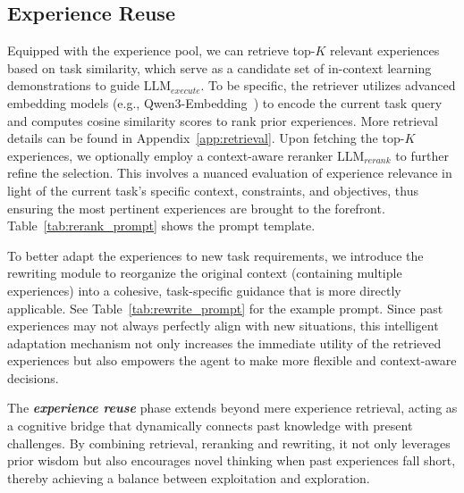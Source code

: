 \documentclass[11pt]{article}
\begin{document}
\subsection{Experience Reuse}\label{sec:reuse}

Equipped with the experience pool, we can retrieve top-$K$ relevant experiences based on task similarity, which serve as a candidate set of in-context learning demonstrations to guide $\text{LLM}_{execute}$. 
To be specific, the retriever utilizes advanced embedding models (e.g., Qwen3-Embedding~\citep{qwen3embedding}) to encode the current task query and computes cosine similarity scores to rank prior experiences. 
More retrieval details can be found in Appendix~\ref{app:retrieval}. 
Upon fetching the top-$K$ experiences, we optionally employ a context-aware reranker $\text{LLM}_{rerank}$ to further refine the selection. 
This involves a nuanced evaluation of experience relevance in light of the current task's specific context, constraints, and objectives, thus ensuring the most pertinent experiences are brought to the forefront. 
Table~\ref{tab:rerank_prompt} shows the prompt template.

To better adapt the experiences to new task requirements, we introduce the rewriting module to reorganize the original context (containing multiple experiences) into a cohesive, task-specific guidance that is more directly applicable. 
See Table~\ref{tab:rewrite_prompt} for the example prompt. 
Since past experiences may not always perfectly align with new situations, this intelligent adaptation mechanism not only increases the immediate utility of the retrieved experiences but also empowers the agent to make more flexible and context-aware decisions.




The \textbf{\textit{experience reuse}} phase extends beyond mere experience retrieval, acting as a cognitive bridge that dynamically connects past knowledge with present challenges. 
By combining retrieval, reranking and rewriting, it not only leverages prior wisdom but also encourages novel thinking when past experiences fall short, thereby achieving a balance between exploitation and exploration.
\end{document}
